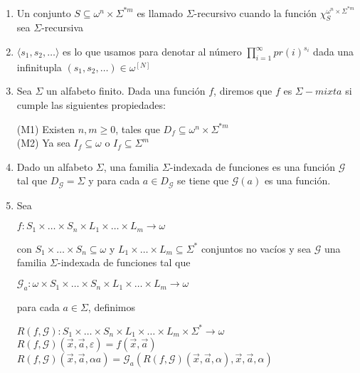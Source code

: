 \documentclass{article}
\begin{document}
\begin{enumerate}
    \item Un conjunto $S \subseteq \omega^n \times \Sigma^{*m}$ 
    es llamado $\Sigma$-recursivo cuando la función $\chi_{S}^{\omega^n \times \Sigma^{*m}}$
    sea $\Sigma$-recursiva
    \item $\langle s_1, s_2, \dots \rangle$ es lo que usamos para denotar al número
    $\displaystyle \prod_{i=1}^{\infty} pr(i)^{s_i}$ dada una infinitupla 
    $(s_1, s_2, \dots) \in \omega^{[N]}$
    \item Sea $\Sigma$ un alfabeto finito. Dada una función $f$, diremos que $f$ es 
    $\Sigma-mixta$ si cumple las siguientes propiedades:
    
        (M1) Existen $n, m \geq 0$, tales que $D_f \subseteq \omega^n \times \Sigma^{*m}$\\
        (M2) Ya sea $I_f \subseteq \omega$ o $I_f \subseteq \Sigma^{m}$
    
    \item Dado un alfabeto $\Sigma$, una familia $\Sigma$-indexada de funciones es una función $\mathcal{G}$ tal que $D_{\mathcal{G}} = \Sigma$ y para cada
    $a \in D_{\mathcal{G}}$ se tiene que $\mathcal{G}(a)$ es una función.
    \item Sea
    \begin{center}
        $f : S_1 \times \dots \times S_n \times L_1 \times \dots \times L_m \rightarrow \omega$ 
    \end{center}
    con $S_1 \times \dots \times S_n \subseteq \omega$ y $L_1 \times \dots \times L_m \subseteq \Sigma^{*}$
    conjuntos no vacíos y sea $\mathcal{G}$ una familia $\Sigma$-indexada de funciones
    tal que 
    \begin{center}
        $\mathcal{G}_a : \omega \times S_1 \times \dots \times S_n \times L_1 \times \dots \times L_m \rightarrow \omega$
    \end{center}
    para cada $a \in \Sigma$, definimos
    \begin{center}
        $R(f, \mathcal{G}) : S_1 \times \dots \times S_n \times L_1 \times \dots \times L_m 
        \times \Sigma^{*} \rightarrow \omega$ \\
        $R(f, \mathcal{G}) (\overset{\rightarrow}{x}, \overset{\rightarrow}{a}, \varepsilon) = 
        f(\overset{\rightarrow}{x}, \overset{\rightarrow}{a})$ \\
        $R(f, \mathcal{G}) (\overset{\rightarrow}{x}, \overset{\rightarrow}{a}, \alpha a) = 
        \mathcal{G}_a(R(f, \mathcal{G}) (\overset{\rightarrow}{x}, \overset{\rightarrow}{a}, \alpha), 
        \overset{\rightarrow}{x}, \overset{\rightarrow}{a}, \alpha)$
    \end{center}
\end{enumerate}
\end{document}
